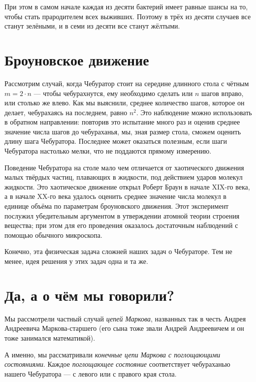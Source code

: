 \documentclass{article}
\begin{document}
При этом в самом начале каждая из десяти бактерий 
имеет равные шансы на то, чтобы стать прародителем всех выживших.
Поэтому в трёх из десяти случаев все станут зелёными, 
и в семи из десяти все станут жёлтыми.


\section{Броуновское движение}

Рассмотрим случай, когда Чебуратор стоит на середине длинного стола с чётным $m=2\cdot n$ ---
чтобы чебурахнутся, ему необходимо сделать или $n$ шагов вправо, или столько же влево.
Как мы выяснили, среднее количество шагов, которое он делает, чебурахаясь на последнем, равно $n^2$. 
Это наблюдение можно использовать в обратном направлении:
повторив это испытание много раз и оценив среднее значение числа шагов до чебураханья, мы, 
зная размер стола, сможем оценить длину шага Чебуратора.
Последнее может оказаться полезным, если шаги Чебуратора настолько мелки, что не поддаются прямому измерению. 

Поведение Чебуратора на столе мало чем отличается 
от хаотического движения малых твёрдых частиц, плавающих в жидкости, под действием ударов молекул жидкости. 
Это хаотическое движение открыл Роберт Браун в начале XIX-го века, а в начале XX-го века удалось оценить
среднее значение числа молекул в единице объёма по параметрам броуновского движения.
Этот эксперимент послужил убедительным аргументом в утверждении атомной теории строения вещества; при этом для его проведения оказалось достаточным
наблюдений с помощью обычного микроскопа.

Конечно, эта физическая задача сложней наших задач о Чебураторе.
Тем не менее, идея решения у этих задач одна и та же.



\section{Да, а о чём мы говорили?}

Мы рассмотрели частный случай \emph{цепей Маркова},
названных так в честь Андрея Андреевича Маркова-старшего (его сына тоже звали Андрей Андреевичем и он тоже занимался математикой).

А именно, мы рассматривали \emph{конечные цепи Маркова с поглощающими состояниями}.
Каждое \emph{поглощающее состояние} соответствует чебураханью нашего Чебуратора --- с левого или с правого края стола.
\end{document}
